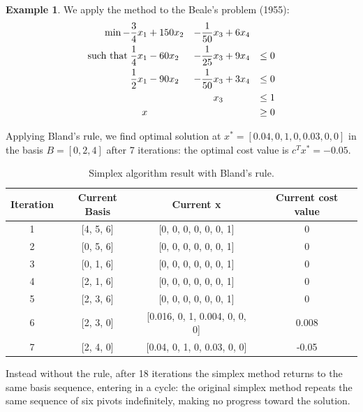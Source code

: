 \documentclass[a4paper,10 pt,titlepage,twoside]{book}
\theoremstyle{plain}
\theoremstyle{definition}
\newtheorem{ex}[thm]{Example}
\theoremstyle{remark}
\begin{document}
\begin{ex}
	We apply the method to the Beale's problem (1955): %
	\begin{alignat*}{4}
	\min -\frac{3}{4}x_{1}&+150x_{2}&-\frac{1}{50}x_{3}&+6x_{4}&\\
	\text{such that\;}\frac{1}{4}x_{1}&-60x_{2}&-\frac{1}{25}x_{3}&+9x_{4}&\leq 0\\
	\frac{1}{2}x_{1}&-90x_{2}&-\frac{1}{50}x_{3}&+3x_{4}&\leq 0\\
	&\;&x_{3}&\;&\leq 1\\
	x&\;&\;&\;&\geq 0\\
	\end{alignat*}
	
Applying Bland's rule, we find optimal solution at $x^{*} = [0.04, 0,  1,   0,  0.03, 0,   0  ]$ in the basis $B = [0, 2, 4]$ after 7 iterations: the optimal cost value is $c^{T}x^{*} = -0.05$.\\

\begin{table}[h]
	\begin{center}
	\begin{tabular}{cccc}
		\hline
		\textbf{Iteration} & \textbf{Current Basis} & \textbf{Current x} & \textbf{Current cost value} \\ \hline
		1 & [4, 5, 6] & [0, 0, 0, 0, 0, 0, 1] & 0 \\
		2 & [0, 5, 6] & [0, 0, 0, 0, 0, 0, 1] & 0 \\
		3 & [0, 1, 6] & [0, 0, 0, 0, 0, 0, 1] & 0 \\
		4 & [2, 1, 6] & [0, 0, 0, 0, 0, 0, 1] & 0 \\
		5 & [2, 3, 6] & [0, 0, 0, 0, 0, 0, 1] & 0 \\
		6 & [2, 3, 0] & [0.016, 0, 1, 0.004, 0, 0, 0] & 0.008 \\
		7 & [2, 4, 0] & [0.04, 0, 1, 0, 0.03, 0, 0] & -0.05 \\ \hline
	\end{tabular}\caption{Simplex algorithm result with Bland's rule.}
\end{center}
\end{table}

Instead without the rule, after 18 iterations the simplex method returns to the same basis sequence, entering in a cycle: the original simplex method repeats the same sequence of six pivots indefinitely, making no progress toward the solution.


\end{ex}
\end{document}
